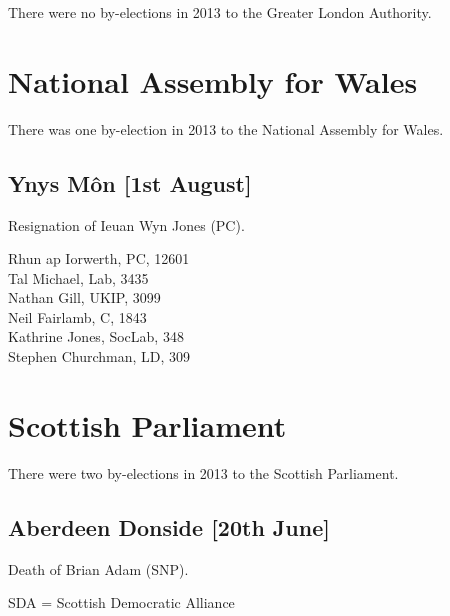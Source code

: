 \documentclass[a4paper,openany,10pt]{book}
\begin{document}
There were no by-elections in 2013 to the Greater London Authority.

\vfill

\section{National Assembly for Wales}

There was one by-election in 2013 to the National Assembly for Wales.

\subsection*{Ynys M\^on \hspace*{\fill}\nolinebreak[1]%
\enspace\hspace*{\fill}
[1st August]}


Resignation of Ieuan Wyn Jones (PC).



Rhun ap Iorwerth, PC, 12601\\
Tal Michael, Lab, 3435\\
Nathan Gill, UKIP, 3099\\
Neil Fairlamb, C, 1843\\
Kathrine Jones, SocLab, 348\\
Stephen Churchman, LD, 309\\


\vfill\eject

\section{Scottish Parliament}

There were two by-elections in 2013 to the Scottish Parliament.

\subsection*{Aberdeen Donside\hspace*{\fill}\nolinebreak[1]%
\enspace\hspace*{\fill}
[20th June]}


Death of Brian Adam (SNP).

SDA = Scottish Democratic Alliance
\end{document}
